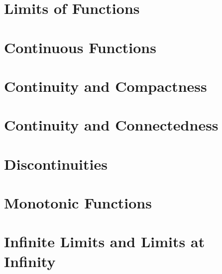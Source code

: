 
\section{Limits of Functions}\label{sec:limits-of-functions}


\section{Continuous Functions}\label{sec:continuous-functions}


\section{Continuity and Compactness}\label{sec:continuity-and-compactness}


\section{Continuity and Connectedness}\label{sec:continuity-and-connectedness}


\section{Discontinuities}\label{sec:discontinuities}


\section{Monotonic Functions}\label{sec:monotonic-functions}


\section{Infinite Limits and Limits at Infinity}\label{sec:infinite-limits-and-limits-at-infinity}

